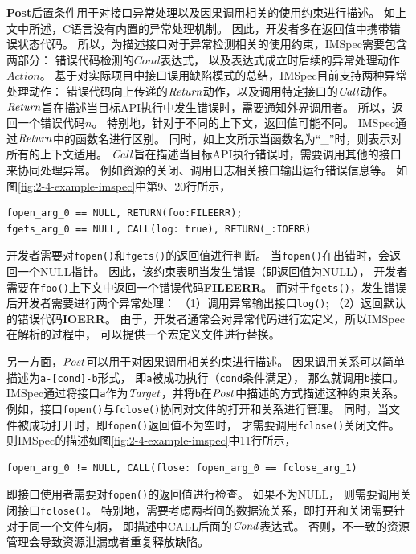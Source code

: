 \textbf{Post}后置条件用于对接口异常处理以及因果调用相关的使用约束进行描述。
如上文中所述，C语言没有内置的异常处理机制。
因此，开发者多在返回值中携带错误状态代码。
所以，为描述接口对于异常检测相关的使用约束，IMSpec需要包含两部分：
错误代码检测的$\mathit{Cond}$表达式，
以及表达式成立时后续的异常处理动作$\mathit{Action}$。
基于对实际项目中接口误用缺陷模式的总结，IMSpec目前支持两种异常处理动作：
错误代码向上传递的$\mathit{Return}$动作，以及调用特定接口的$\mathit{Call}$动作。
$\mathit{Return}$旨在描述当目标API执行中发生错误时，需要通知外界调用者。
所以，返回一个错误代码$n$。
特别地，针对于不同的上下文，返回值可能不同。
IMSpec通过$\mathit{Return}$中的函数名进行区别。
同时，如上文所示当函数名为“\_”时，则表示对所有的上下文适用。
$\mathit{Call}$旨在描述当目标API执行错误时，需要调用其他的接口来协同处理异常。
例如资源的关闭、调用日志相关接口输出运行错误信息等。
如图\ref{fig:2-4-example-imspec}中第9、20行所示，
\begin{lstlisting}[language={[ANSI]C},
basicstyle=\linespread{0.8}\listingsfont,
numbers=none,
xleftmargin=.15\textwidth]
fopen_arg_0 == NULL, RETURN(foo:FILEERR);
fgets_arg_0 == NULL, CALL(log: true), RETURN(_:IOERR)
\end{lstlisting}
开发者需要对\texttt{fopen()}和\texttt{fgets()}的返回值进行判断。
当\texttt{fopen()}在出错时，会返回一个NULL指针。
因此，该约束表明当发生错误（即返回值为NULL），
开发者需要在\texttt{foo()}上下文中返回一个错误代码\textbf{FILEERR}。
而对于\texttt{fgets()}，发生错误后开发者需要进行两个异常处理：
（1）调用异常输出接口\texttt{log()};
（2）返回默认的错误代码\textbf{IOERR}。
由于，开发者通常会对异常代码进行宏定义，所以IMSpec在解析的过程中，
可以提供一个宏定义文件进行替换。

另一方面，$\mathit{Post}$可以用于对因果调用相关约束进行描述。
因果调用关系可以简单描述为\texttt{a-[cond]-b}形式，
即\texttt{a}被成功执行（\texttt{cond}条件满足），
那么就调用\texttt{b}接口。
IMSpec通过将接口\texttt{a}作为$\mathit{Target}$，并将\texttt{b}在$\mathit{Post}$中描述的方式描述这种约束关系。
例如，接口\texttt{fopen()}与\texttt{fclose()}协同对文件的打开和关系进行管理。
同时，当文件被成功打开时，即\texttt{fopen()}返回值不为空时，
才需要调用\texttt{fclose()}关闭文件。
则IMSpec的描述如图\ref{fig:2-4-example-imspec}中11行所示，
\begin{lstlisting}[language={[ANSI]C},
basicstyle=\linespread{0.8}\listingsfont,
numbers=none,
xleftmargin=.15\textwidth]
fopen_arg_0 != NULL, CALL(flose: fopen_arg_0 == fclose_arg_1)
\end{lstlisting}
即接口使用者需要对\texttt{fopen()}的返回值进行检查。
如果不为NULL，
则需要调用关闭接口\texttt{fclose()}。
特别地，需要考虑两者间的数据流关系，即打开和关闭需要针对于同一个文件句柄，
即描述中CALL后面的$\mathit{Cond}$表达式。
否则，不一致的资源管理会导致资源泄漏或者重复释放缺陷。



